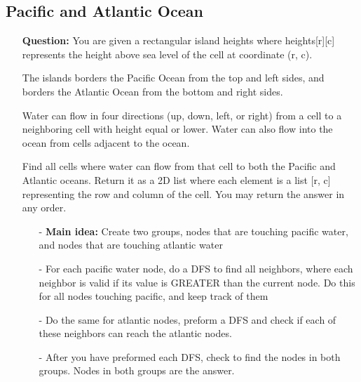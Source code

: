\documentclass[12pt]{article}
\begin{document}
\subsection{Pacific and Atlantic Ocean}
\begin{enumerate}
  \item[] \textbf{Question:} You are given a rectangular island heights where heights[r][c] represents the height above sea level of the cell at coordinate (r, c).

The islands borders the Pacific Ocean from the top and left sides, and borders the Atlantic Ocean from the bottom and right sides.

Water can flow in four directions (up, down, left, or right) from a cell to a neighboring cell with height equal or lower. Water can also flow into the ocean from cells adjacent to the ocean.

Find all cells where water can flow from that cell to both the Pacific and Atlantic oceans. Return it as a 2D list where each element is a list [r, c] representing the row and column of the cell. You may return the answer in any order.

    \begin{enumerate}
      \item[-] \textbf{Main idea:} Create two groups, nodes that are touching pacific water, and nodes that are touching atlantic water
      \item[-] For each pacific water node, do a DFS to find all neighbors, where each neighbor is valid if its value is GREATER than the current node. Do this for all nodes touching pacific, and keep track of them
      \item[-] Do the same for atlantic nodes, preform a DFS and check if each of these neighbors can reach the atlantic nodes.
      \item[-] After you have preformed each DFS, check to find the nodes in both groups. Nodes in both groups are the answer.
    \end{enumerate}
\end{enumerate}
\end{document}
